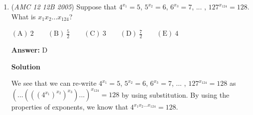 \begin{enumerate}
 $\mathrm{(A)}\ {{{1}}} \qquad \mathrm{(B)}\ {{{2}}} \qquad \mathrm{(C)}\ {{{4}}} \qquad \mathrm{(D)}\ {{{8}}} \qquad \mathrm{(E)}\ {{{16}}}$

 \textbf{Answer: }D



\textbf{Solution 1}

Let $x^2 + px + m = 0$ have roots $a$ and $b$. Then 

 
 \[x^2 + px + m = (x-a)(x-b) = x^2 - (a+b)x + ab,\]

 so $p = -(a+b)$ and $m = ab$. Also, $x^2 + mx + n = 0$ has roots $2a$ and $2b$, so

 
 \[x^2 + mx + n = (x-2a)(x-2b) = x^2 - 2(a+b)x + 4ab,\]

 and $m = -2(a+b)$ and $n = 4ab$. Thus $\frac{n}{p} = \frac{4ab}{-(a+b)} = \frac{4m}{\frac{m}{2}} = \boxed{\textbf{(D) }8}$. 

 To test that this actually works, consider the quadratics $x^2 + 8x + 16 = 0,\ x^2 + 16x + 64 = 0$.

 



\textbf{Solution 2}

If the roots of $x^2 + mx + n = 0$ are $2a$ and $2b$ and the roots of $x^2 + px + m = 0$ are $a$ and $b$, then using Vieta's formulas,
 \[2a + 2b = -m\]
 \[a + b = -p\]
 \[2a(2b) = n\]
 \[a(b) = m\]Therefore, substituting the second equation into the first equation gives 
 \[m = 2(p)\]and substituting the fourth equation into the third equation gives
 \[n = 4(m)\]Therefore, $n = 8p$, so $\frac{n}{p}= \boxed{\textbf{(D) }8}$



	\item (\textit{AMC 12 12B 2005}) Suppose that $4^{x_1}=5$, $5^{x_2}=6$, $6^{x_3}=7$, ... , $127^{x_{124}}=128$.  What is $x_1x_2...x_{124}$?


 $\mathrm{(A)}\ {{{2}}} \qquad \mathrm{(B)}\ {{{\frac{5}{2}}}} \qquad \mathrm{(C)}\ {{{3}}} \qquad \mathrm{(D)}\ {{{\frac{7}{2}}}} \qquad \mathrm{(E)}\ {{{4}}}$

 \textbf{Answer: }D



\textbf{Solution}

We see that we can re-write $4^{x_1}=5$, $5^{x_2}=6$, $6^{x_3}=7$, ... , $127^{x_{124}}=128$ as $\left(...\left(\left(\left(4^{x_1}\right)^{x_2}\right)^{x_3}\right)...\right)^{x_{124}}=128$ by using substitution. By using the properties of exponents, we know that $4^{x_1x_2...x_{124}}=128$. 


\end{enumerate}
